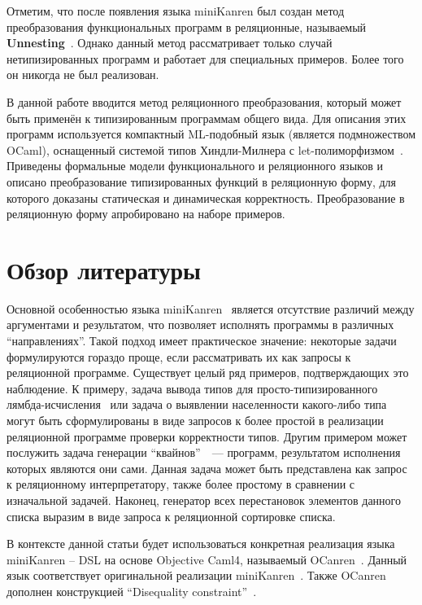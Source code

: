 Отметим, что после появления языка miniKanren был создан метод преобразования функциональных программ в реляционные, называемый \textbf{Unnesting}~\cite{lozov-spbu:miniKanren}. Однако данный метод рассматривает только случай нетипизированных программ и работает для специальных примеров. Более того он никогда не был реализован.

В данной работе вводится метод реляционного преобразования, который может быть применён к типизированным программам общего вида. Для описания этих программ используется компактный ML-подобный язык (является подмножеством OCaml), оснащенный системой типов Хиндли-Милнера с let-полиморфизмом~\cite{lozov-spbu:poly}. Приведены формальные модели функционального и реляционного языков и описано преобразование типизированных функций в реляционную форму, для которого доказаны статическая и динамическая корректность. Преобразование в реляционную форму апробировано на наборе примеров.

\section{Обзор литературы}

Основной особенностью языка miniKanren~\cite{lozov-spbu:TheReasonedSchemer,lozov-spbu:miniKanren} является отсутствие различий между аргументами и результатом, что позволяет исполнять программы в различных ``направлениях''. Такой подход имеет практическое значение: некоторые задачи формулируются гораздо проще, если рассматривать их как запросы к реляционной программе. Существует целый ряд примеров, подтверждающих это наблюдение. К примеру, задача вывода типов для просто-типизированного лямбда-исчисления~\cite{Lambda} или задача о выявлении населенности какого-либо типа могут быть сформулированы в виде запросов к более простой в реализации реляционной программе проверки корректности типов. Другим примером может послужить задача генерации ``квайнов''~\cite{lozov-spbu:quines}~--- программ, результатом исполнения которых являются они сами. Данная задача может быть представлена как запрос к реляционному интерпретатору, также более простому в сравнении с изначальной задачей. Наконец, генератор всех перестановок элементов данного списка выразим в виде запроса к реляционной сортировке списка.

В контексте данной статьи будет использоваться конкретная реализация языка miniKanren -- DSL на основе Objective Caml4, называемый OCanren~\cite{lozov-spbu:ocanren-git}. Данный язык соответствует оригинальной реализации miniKanren~\cite{lozov-spbu:implementation}. Также OCanren дополнен конструкцией ``Disequality constraint''~\cite{lozov-spbu:CKanren}.


